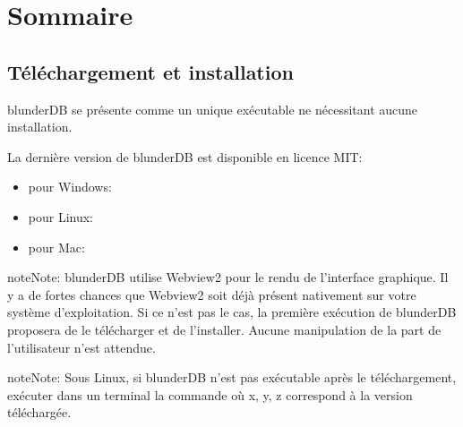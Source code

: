 \documentclass[letterpaper,10pt,french]{sphinxmanual}
\begin{document}
\chapter{Sommaire}
\label{\detokenize{index:sommaire}}
\sphinxstepscope


\section{Téléchargement et installation}
\label{\detokenize{telecharge_install:telechargement-et-installation}}\label{\detokenize{telecharge_install::doc}}
\sphinxAtStartPar
blunderDB se présente comme un unique exécutable ne nécessitant aucune installation.

\sphinxAtStartPar
La dernière version de blunderDB est disponible en licence MIT:
\begin{itemize}
\item {} 
\sphinxAtStartPar
pour Windows: 

\item {} 
\sphinxAtStartPar
pour Linux: 

\item {} 
\sphinxAtStartPar
pour Mac: 

\end{itemize}

\begin{sphinxadmonition}{note}{Note:}
\sphinxAtStartPar
blunderDB utilise Webview2 pour le rendu de l’interface graphique. Il
y a de fortes chances que Webview2 soit déjà présent nativement sur votre
système d’exploitation. Si ce n’est pas le cas, la première exécution de
blunderDB proposera de le télécharger et de l’installer. Aucune manipulation
de la part de l’utilisateur n’est attendue.
\end{sphinxadmonition}

\begin{sphinxadmonition}{note}{Note:}
\sphinxAtStartPar
Sous Linux, si blunderDB n’est pas exécutable après le
téléchargement, exécuter dans un terminal la commande  où x, y, z correspond à la version téléchargée.
\end{sphinxadmonition}
\end{document}
